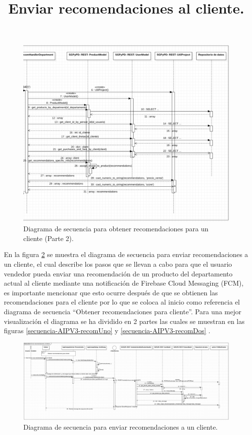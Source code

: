 \FloatBarrier
\begin{figure}[htbp!]
		\centering
			\includegraphics[width=1 \textwidth]{imagenes/adrian/vendedor/prototipo3/obtenerRecomendaciones2}
		\caption{Diagrama de secuencia para obtener recomendaciones para un cliente (Parte 2).}
		\label{secuencia-AIPV3-obtenRecomDos}
\end{figure}
\FloatBarrier

\title{\textbf{Enviar recomendaciones al cliente.}\\}

En la figura \ref{secuencia-AIPV3-recom} se muestra el diagrama de secuencia para enviar recomendaciones a un cliente, el cual describe los pasos que se llevan a cabo para que el usuario vendedor pueda enviar una recomendación de un producto del departamento actual al cliente mediante una notificación de Firebase Cloud Messaging (FCM), es importante mencionar que esto ocurre después de que se obtienen las recomendaciones para el cliente por lo que se coloca al inicio como referencia el diagrama de secuencia ``Obtener recomendaciones para cliente''. Para una mejor visualización el diagrama se ha dividido en 2 partes las cuales se muestran en las figuras \ref{secuencia-AIPV3-recomUno} y \ref{secuencia-AIPV3-recomDos} .

\FloatBarrier
\begin{figure}[htbp!]
		\centering
			\includegraphics[width=1 \textwidth]{imagenes/adrian/vendedor/prototipo3/enviarRecomendaciones}
		\caption{Diagrama de secuencia para enviar recomendaciones a un cliente.}
		\label{secuencia-AIPV3-recom}
\end{figure}
\FloatBarrier

